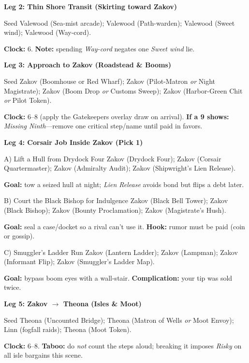 \documentclass[11pt,letterpaper,twoside]{book}
\begin{document}
\textbf{Leg 2: Thin Shore Transit (Skirting toward Zakov)}
\begin{Leg}{Seed}
Valewood \SuitSpade{} (Sea-mist arcade);
Valewood \SuitHeart{} (Path-warden);
Valewood \SuitClub{} (Sweet wind);
Valewood \SuitDiamond{} (Way-cord).
\end{Leg}
\textbf{Clock:} 6. \textbf{Note:} spending \emph{Way-cord} negates one \emph{Sweet wind} lie.

\textbf{Leg 3: Approach to Zakov (Roadstead \& Booms)}
\begin{Leg}{Seed}
Zakov \SuitSpade{} (Boomhouse or Red Wharf);
Zakov \SuitHeart{} (Pilot-Matron \emph{or} Night Magistrate);
Zakov \SuitClub{} (Boom Drop \emph{or} Customs Sweep);
Zakov \SuitDiamond{} (Harbor-Green Chit \emph{or} Pilot Token).
\end{Leg}
\textbf{Clock:} 6--8 (apply the Gatekeepers overlay draw on arrival). \textbf{If a 9 shows:} \emph{Missing Ninth}—remove one critical step/name until paid in favors.

\textbf{Leg 4: Corsair Job Inside Zakov (Pick 1)}
\begin{Leg}{A) Lift a Hull from Drydock Four}
Zakov \SuitSpade{} (Drydock Four);
Zakov \SuitHeart{} (Corsair Quartermaster);
Zakov \SuitClub{} (Admiralty Audit);
Zakov \SuitDiamond{} (Shipwright's Lien Release).
\end{Leg}
\textbf{Goal:} tow a seized hull at night; \emph{Lien Release} avoids bond but flips a debt later.

\begin{Leg}{B) Court the Black Bishop for Indulgence}
Zakov \SuitSpade{} (Black Bell Tower);
Zakov \SuitHeart{} (Black Bishop);
Zakov \SuitClub{} (Bounty Proclamation);
Zakov \SuitDiamond{} (Magistrate's Hush).
\end{Leg}
\textbf{Goal:} seal a case/docket so a rival can't use it. \textbf{Hook:} rumor must be paid (coin or gossip).

\begin{Leg}{C) Smuggler's Ladder Run}
Zakov \SuitSpade{} (Lantern Ladder);
Zakov \SuitHeart{} (Lampman);
Zakov \SuitClub{} (Informant Flip);
Zakov \SuitDiamond{} (Smuggler's Ladder Map).
\end{Leg}
\textbf{Goal:} bypass boom eyes with a wall-stair. \textbf{Complication:} your tip was sold twice.

\textbf{Leg 5: Zakov $\rightarrow$ Theona (Isles \& Moot)}
\begin{Leg}{Seed}
Theona \SuitSpade{} (Uncounted Bridge);
Theona \SuitHeart{} (Matron of Wells \emph{or} Moot Envoy);
Linn \SuitClub{} (fogfall raids);
Theona \SuitDiamond{} (Moot Token).
\end{Leg}
\textbf{Clock:} 6--8. \textbf{Taboo:} do \emph{not} count the steps aloud; breaking it imposes \emph{Risky} on all isle bargains this scene.
\end{document}
